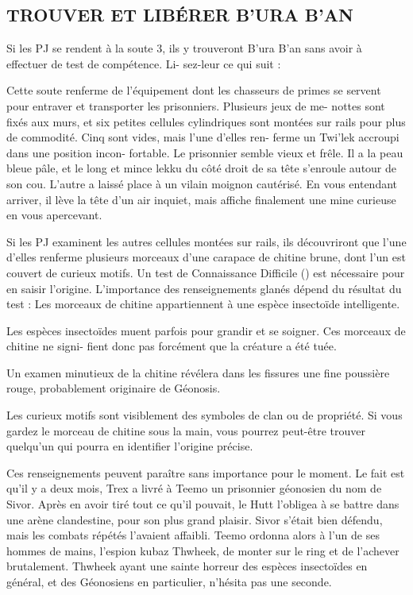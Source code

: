 \documentclass[a4paper,10pt,twoside,twocolumn,openany]{book}
\begin{document}
\subsection{TROUVER ET LIBÉRER B’URA B’AN}

Si les PJ se rendent à la soute 3, ils y trouveront B’ura
B’an sans avoir à effectuer de test de compétence. Li-
sez-leur ce qui suit :
\begin{quotebox}
    
Cette soute renferme de l’équipement dont les
chasseurs de primes se servent pour entraver et
transporter les prisonniers. Plusieurs jeux de me-
nottes sont fixés aux murs, et six petites cellules
cylindriques sont montées sur rails pour plus de
commodité. Cinq sont vides, mais l’une d’elles ren-
ferme un Twi’lek accroupi dans une position incon-
fortable. Le prisonnier semble vieux et frêle. Il a
la peau bleue pâle, et le long et mince lekku du
côté droit de sa tête s’enroule autour de son cou.
L’autre a laissé place à un vilain moignon cautérisé.
En vous entendant arriver, il lève la tête d’un air
inquiet, mais affiche finalement une mine curieuse
en vous apercevant.
\end{quotebox}

Si les PJ examinent les autres cellules montées sur
rails, ils découvriront que l’une d’elles renferme plusieurs
morceaux d’une carapace de chitine brune, dont l’un est
couvert de curieux motifs. Un test de Connaissance
Difficile (\difficulty \difficulty \difficulty) est nécessaire pour en saisir l’origine.
L’importance des renseignements glanés dépend du résultat du test :
\successA Les morceaux de chitine appartiennent à une espèce insectoïde intelligente.

\successA \successA Les espèces insectoïdes muent parfois pour
grandir et se soigner. Ces morceaux de chitine ne signi-
fient donc pas forcément que la créature a été tuée.

\advantage Un examen minutieux de la chitine révélera dans
les fissures une fine poussière rouge, probablement originaire de Géonosis.

\triumph Les curieux motifs sont visiblement des symboles
de clan ou de propriété. Si vous gardez le morceau de
chitine sous la main, vous pourrez peut-être trouver
quelqu’un qui pourra en identifier l’origine précise.

Ces renseignements peuvent paraître sans importance
pour le moment. Le fait est qu’il y a deux mois, Trex a
livré à Teemo un prisonnier géonosien du nom de Sivor.
Après en avoir tiré tout ce qu’il pouvait, le Hutt l’obligea
à se battre dans une arène clandestine, pour son plus grand plaisir. Sivor s’était bien défendu, mais les combats répétés l’avaient affaibli. Teemo ordonna alors à l’un
de ses hommes de mains, l’espion kubaz Thwheek, de
monter sur le ring et de l’achever brutalement. Thwheek
ayant une sainte horreur des espèces insectoïdes en général, et des Géonosiens en particulier, n’hésita pas une
seconde.
\end{document}

